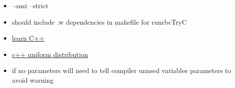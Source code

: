 \documentclass[hyperref]{labbook}
\begin{document}













\begin{itemize}
\item  --ansi --strict 
\end{itemize}

\begin{itemize}
\item should include .w dependencies in makefile for runrbcTryC
\item \href{http://www.learncpp.com}{learn C++}
\end{itemize}


  \begin{itemize}
  \item \href{http://www.cplusplus.com/reference/random/uniform_int_distribution/}{c++ uniform distribution}
  \item if no parameters will need to tell compiler unused variables parameters to avoid warning
  \end{itemize}
\end{document}
